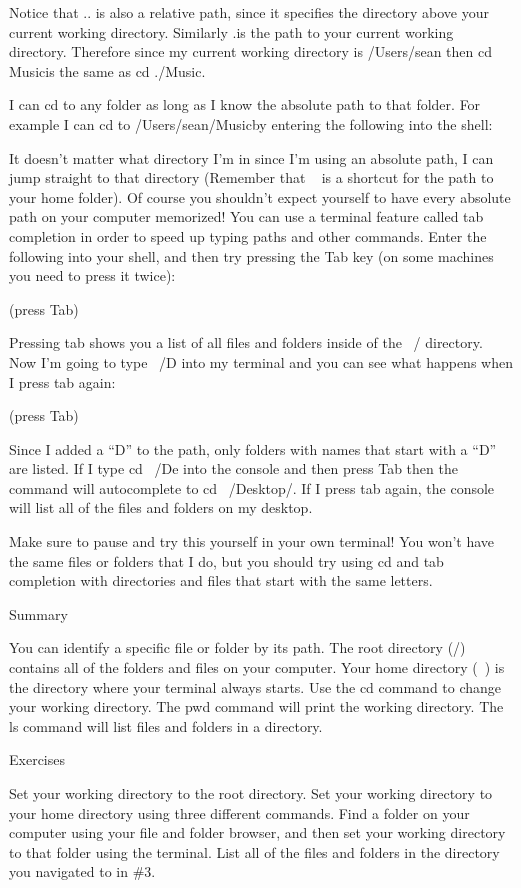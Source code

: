 Notice that .. is also a relative path, since it specifies the directory above your current working directory. Similarly .is the path to your current working directory. Therefore since my current working directory is /Users/sean then cd Musicis the same as cd ./Music.

I can cd to any folder as long as I know the absolute path to that folder. For example I can cd to /Users/sean/Musicby entering the following into the shell:

It doesn’t matter what directory I’m in since I’m using an absolute path, I can jump straight to that directory (Remember that ~ is a shortcut for the path to your home folder). Of course you shouldn’t expect yourself to have every absolute path on your computer memorized! You can use a terminal feature called tab completion in order to speed up typing paths and other commands. Enter the following into your shell, and then try pressing the Tab key (on some machines you need to press it twice):

(press Tab)

Pressing tab shows you a list of all files and folders inside of the ~/ directory. Now I’m going to type ~/D into my terminal and you can see what happens when I press tab again:

(press Tab)

Since I added a “D” to the path, only folders with names that start with a “D” are listed. If I type cd ~/De into the console and then press Tab then the command will autocomplete to cd ~/Desktop/. If I press tab again, the console will list all of the files and folders on my desktop.

Make sure to pause and try this yourself in your own terminal! You won’t have the same files or folders that I do, but you should try using cd and tab completion with directories and files that start with the same letters.

Summary

You can identify a specific file or folder by its path.
The root directory (/) contains all of the folders and files on your computer.
Your home directory (~) is the directory where your terminal always starts.
Use the cd command to change your working directory.
The pwd command will print the working directory.
The ls command will list files and folders in a directory.


Exercises

Set your working directory to the root directory.
Set your working directory to your home directory using three different commands.
Find a folder on your computer using your file and folder browser, and then set your working directory to that folder using the terminal.
List all of the files and folders in the directory you navigated to in \#3.

